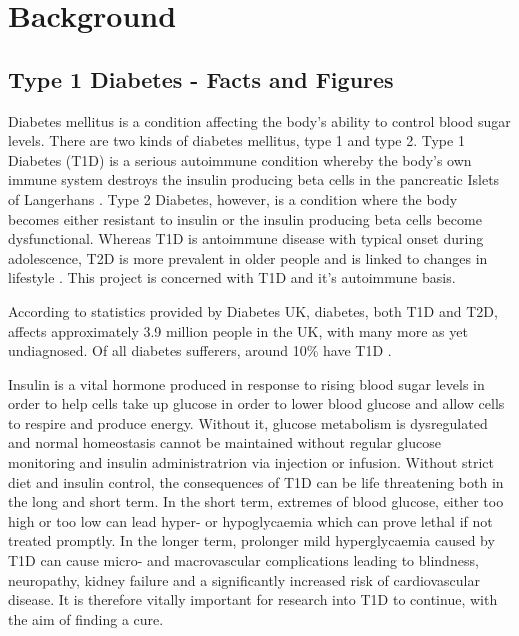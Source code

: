 
\chapter{Background}


\section{Type 1 Diabetes - Facts and Figures}
\label{sec:sectionLabel}


Diabetes mellitus is a condition affecting the body's ability to control blood sugar levels.
There are two kinds of diabetes mellitus, type 1 and type 2.
Type 1 Diabetes (T1D) is a serious autoimmune condition whereby the body's own immune system destroys the insulin producing beta cells in the pancreatic Islets of Langerhans \citep{Daneman2006}.
Type 2 Diabetes, however, is a condition where the body becomes either resistant to insulin or the insulin producing beta cells become dysfunctional.
Whereas T1D is antoimmune disease with typical onset during adolescence, T2D is more prevalent in older people and is linked to changes in lifestyle \citep{OxClinMed}.
This project is concerned with T1D and it's autoimmune basis.

According to statistics provided by Diabetes UK, diabetes, both T1D and T2D, affects approximately 3.9 million people in the UK, with many more as yet undiagnosed. 
Of all diabetes sufferers, around 10\% have T1D .

Insulin is a vital hormone produced in response to rising blood sugar levels in order to help cells take up glucose in order to lower blood glucose and allow cells to respire and produce energy.
Without it, glucose metabolism is dysregulated and normal homeostasis cannot be maintained without regular glucose monitoring and insulin administratrion via injection or infusion.
Without strict diet and insulin control, the consequences of T1D can be life threatening both in the long and short term.
In the short term, extremes of blood glucose, either too high or too low can lead hyper- or hypoglycaemia which can prove lethal if not treated promptly.
In the longer term, prolonger mild hyperglycaemia caused by T1D can cause micro- and macrovascular complications leading to blindness, neuropathy, kidney failure and a significantly increased risk of cardiovascular disease.
It is therefore vitally important for research into T1D to continue, with the aim of finding a cure.

